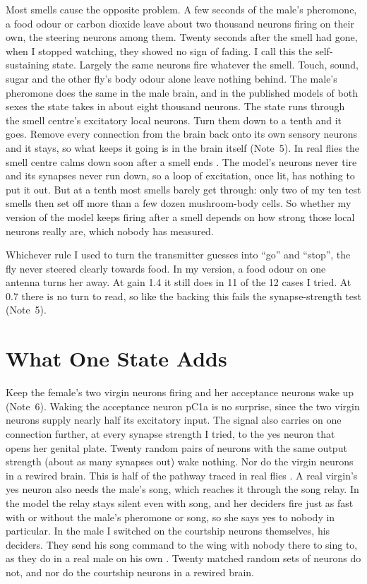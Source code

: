 \documentclass[11pt,a4paper]{article}
\newcommand{\note}[1]{(Note~#1)}
\begin{document}
Most smells cause the opposite problem. A few seconds of the male's pheromone, a food odour or carbon dioxide leave about two thousand neurons firing on their own, the steering neurons among them. Twenty seconds after the smell had gone, when I stopped watching, they showed no sign of fading. I call this the self-sustaining state. Largely the same neurons fire whatever the smell. Touch, sound, sugar and the other fly's body odour alone leave nothing behind. The male's pheromone does the same in the male brain, and in the published models of both sexes the state takes in about eight thousand neurons. The state runs through the smell centre's excitatory local neurons. Turn them down to a tenth and it goes. Remove every connection from the brain back onto its own sensory neurons and it stays, so what keeps it going is in the brain itself \note{5}. In real flies the smell centre calms down soon after a smell ends \citep{wilson2004transformation}. The model's neurons never tire and its synapses never run down, so a loop of excitation, once lit, has nothing to put it out. But at a tenth most smells barely get through: only two of my ten test smells then set off more than a few dozen mushroom-body cells. So whether my version of the model keeps firing after a smell depends on how strong those local neurons really are, which nobody has measured.

Whichever rule I used to turn the transmitter guesses into ``go'' and ``stop'', the fly never steered clearly towards food. In my version, a food odour on one antenna turns her away. At gain 1.4 it still does in 11 of the 12 cases I tried. At 0.7 there is no turn to read, so like the backing this fails the synapse-strength test \note{5}.

\section{What One State Adds}
\label{sec:states}

Keep the female's two virgin neurons firing and her acceptance neurons wake up \note{6}. Waking the acceptance neuron pC1a is no surprise, since the two virgin neurons supply nearly half its excitatory input. The signal also carries on one connection further, at every synapse strength I tried, to the yes neuron that opens her genital plate. Twenty random pairs of neurons with the same output strength (about as many synapses out) wake nothing. Nor do the virgin neurons in a rewired brain. This is half of the pathway traced in real flies \citep{wang2021neural}. A real virgin's yes neuron also needs the male's song, which reaches it through the song relay. In the model the relay stays silent even with song, and her deciders fire just as fast with or without the male's pheromone or song, so she says yes to nobody in particular. In the male I switched on the courtship neurons themselves, his deciders. They send his song command to the wing with nobody there to sing to, as they do in a real male on his own \citep{vonphilipsborn2011neuronal}. Twenty matched random sets of neurons do not, and nor do the courtship neurons in a rewired brain.
\end{document}
